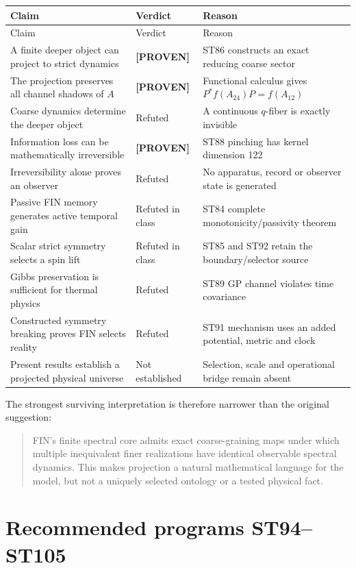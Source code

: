 \documentclass[11pt,a4paper]{article}
\newcommand{\proven}{\textcolor{green!40!black}{\textbf{[PROVEN]}}}
\begin{document}
\begin{longtable}{@{}p{}p{}p{}@{}}
\toprule Claim & Verdict & Reason\\\midrule\endfirsthead
\toprule Claim & Verdict & Reason\\\midrule\endhead
A finite deeper object can project to strict dynamics & \proven{} & ST86 constructs an exact reducing coarse sector\\
The projection preserves all channel shadows of $A$ & \proven{} & Functional calculus gives $P^*f(A_{24})P=f(A_{12})$\\
Coarse dynamics determine the deeper object & Refuted & A continuous $q$-fiber is exactly invisible\\
Information loss can be mathematically irreversible & \proven{} & ST88 pinching has kernel dimension 122\\
Irreversibility alone proves an observer & Refuted & No apparatus, record or observer state is generated\\
Passive FIN memory generates active temporal gain & Refuted in class & ST84 complete monotonicity/passivity theorem\\
Scalar strict symmetry selects a spin lift & Refuted in class & ST85 and ST92 retain the boundary/selector source\\
Gibbs preservation is sufficient for thermal physics & Refuted & ST89 GP channel violates time covariance\\
Constructed symmetry breaking proves FIN selects reality & Refuted & ST91 mechanism uses an added potential, metric and clock\\
Present results establish a projected physical universe & Not established & Selection, scale and operational bridge remain absent\\
\bottomrule
\end{longtable}

The strongest surviving interpretation is therefore narrower than the original suggestion:
\begin{quote}
FIN's finite spectral core admits exact coarse-graining maps under which multiple inequivalent finer realizations have identical observable spectral dynamics. This makes projection a natural mathematical language for the model, but not a uniquely selected ontology or a tested physical fact.
\end{quote}

\section{Recommended programs ST94--ST105}
\end{document}
